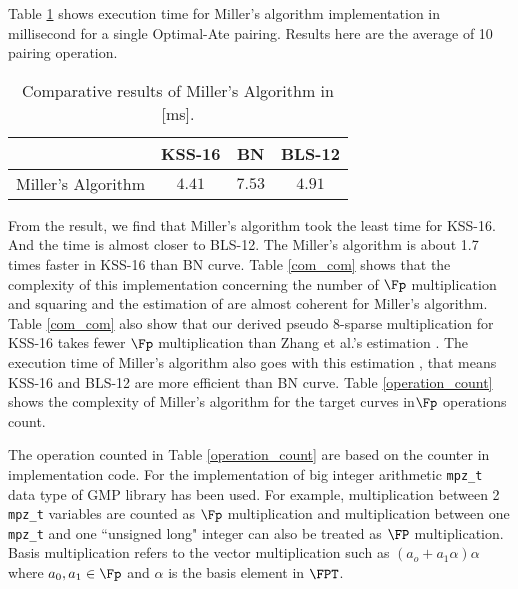 \renewcommand{\baselinestretch}{1.0}
Table \ref{result_table} shows execution time for Miller's algorithm implementation in millisecond for a single Optimal-Ate pairing. Results here are the average of 10 pairing operation.
\renewcommand{\baselinestretch}{1.5}
\begin{table}[h!]
\centering
\caption{Comparative results of Miller's Algorithm in [ms].}
\label{result_table}
\begin{tabular}{l|c|c|c|}
\cline{2-4}
                                         & KSS-16 & \quad BN   \quad  & BLS-12 \\ \hline
\multicolumn{1}{|l|}{Miller's Algorithm} & $4.41$ & $7.53$ & $4.91$ \\ \hline
\end{tabular}
\end{table}
\renewcommand{\baselinestretch}{1.0}
From the result, we find that Miller's algorithm took the least time for  KSS-16. 
And the time is almost closer to BLS-12.
The Miller's algorithm is about 1.7 times faster in KSS-16 than BN curve. 
Table \ref{com_com} shows that the complexity of this implementation concerning the number of $\Fp$ multiplication and squaring and the estimation of \cite{sylvain_new_param} are almost coherent for Miller's algorithm. 
Table \ref{com_com} also show that our derived pseudo 8-sparse multiplication for KSS-16 takes fewer $\Fp$ multiplication than Zhang et al.'s estimation \cite{INDOCRYPT:ZhaLin12}.
The execution time of Miller's algorithm also goes with this estimation \cite{sylvain_new_param}, that means KSS-16 and BLS-12 are more efficient than BN curve.
Table \ref{operation_count} shows the complexity of Miller's algorithm for the target curves in$\Fp$ operations count.

The operation counted in Table \ref{operation_count} are based on the counter in implementation code. For the implementation of big integer arithmetic  \texttt{mpz\_t} data type of GMP \cite{gmp} library has been used. 
For example, multiplication between 2 \texttt{mpz\_t} variables are counted as $\Fp$  multiplication and  multiplication between one \texttt{mpz\_t} and one ``unsigned long" integer can also be treated as $\FP$ multiplication.
Basis multiplication refers to the vector multiplication such as $(a_o+a_1\alpha)\alpha$ where $a_0,a_1\in \Fp $ and $\alpha$ is the basis element in $\FPT$. 

